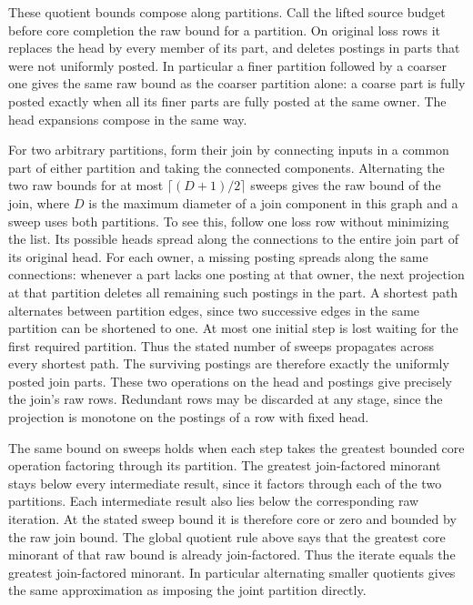These quotient bounds compose along partitions.
Call the lifted source budget before core
completion the raw bound for a partition.
On original loss rows it replaces the head
by every member of its part, and deletes
postings in parts that were not uniformly
posted. In particular a finer partition
followed by a coarser one gives the same
raw bound as the coarser partition alone:
a coarse part is fully posted exactly when
all its finer parts are fully posted at
the same owner. The head expansions
compose in the same way.

For two arbitrary partitions, form their
join by connecting inputs in a common
part of either partition and taking the
connected components. Alternating the
two raw bounds for at most
$\lceil(D+1)/2\rceil$ sweeps gives the
raw bound of the join, where $D$ is
the maximum diameter of a join
component in this graph and a sweep
uses both partitions. To see this, follow
one loss row without minimizing the list.
Its possible heads spread along the
connections to the entire join part of
its original head. For each owner,
a missing posting spreads along the
same connections: whenever a part lacks
one posting at that owner, the next
projection at that partition deletes
all remaining such postings in the part.
A shortest path alternates between
partition edges, since two successive
edges in the same partition can be
shortened to one. At most one initial
step is lost waiting for the first
required partition. Thus the stated
number of sweeps propagates across
every shortest path. The surviving postings
are therefore exactly the uniformly
posted join parts. These two operations
on the head and postings give precisely
the join's raw rows. Redundant rows may
be discarded at any stage, since the
projection is monotone on the postings
of a row with fixed head.

The same bound on sweeps holds when
each step takes the greatest bounded
core operation factoring through its
partition. The greatest join-factored
minorant stays below every intermediate
result, since it factors through each
of the two partitions. Each intermediate
result also lies below the corresponding
raw iteration. At the stated sweep bound it is
therefore core or zero and bounded by
the raw join bound. The global quotient
rule above says that the greatest core
minorant of that raw bound is already
join-factored. Thus the iterate equals
the greatest join-factored minorant.
In particular alternating smaller
quotients gives the same approximation
as imposing the joint partition directly.

